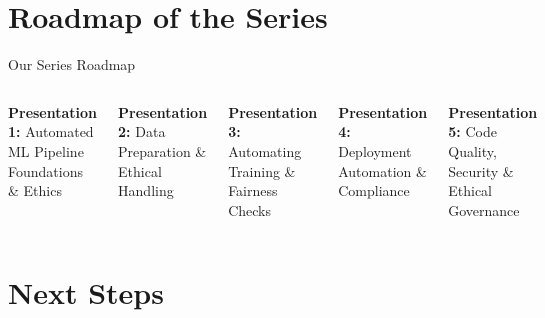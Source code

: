 \documentclass[aspectratio=169]{beamer}
\begin{document}
\section{Roadmap of the Series}

\begin{frame}{Our Series Roadmap}
\begin{columns}[T,onlytextwidth]
\textbf{Presentation 1:} Automated ML Pipeline Foundations \& Ethics

\textbf{Presentation 2:} Data Preparation \& Ethical Handling

\textbf{Presentation 3:} Automating Training \& Fairness Checks

\textbf{Presentation 4:} Deployment Automation \& Compliance

\textbf{Presentation 5:} Code Quality, Security \& Ethical Governance
\end{columns}
\end{frame}

\section{Next Steps}
\end{document}
